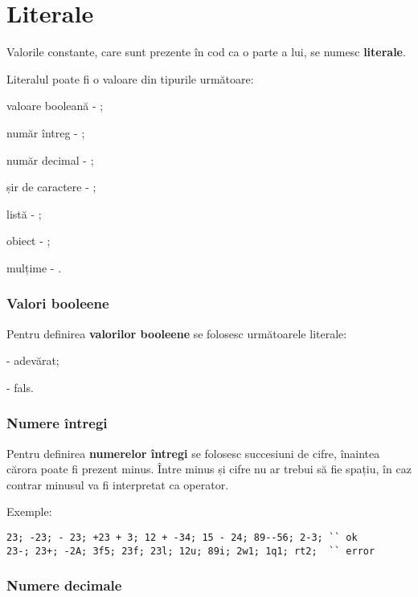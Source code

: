 \section{Literale}

Valorile constante, care sunt prezente în cod ca o parte a lui, se numesc {\bf literale}.

Literalul poate fi o valoare din tipurile următoare:

\begin{icItems}
	\item
		valoare booleană - \bool{};
	\item
		număr întreg - \integer{};
	\item
		număr decimal - \double{};
	\item
		șir de caractere - \str{};
	\item
		listă - \listtype{};
	\item
		obiect - \object{};
	\item
		mulțime - \set{}.
\end{icItems}

\subsubsection{Valori booleene}

Pentru definirea {\bf valorilor booleene} se folosesc următoarele literale:
\begin{icItems}
	\item \true{} - adevărat;
	\item \false{} - fals.
\end{icItems}

\subsubsection{Numere întregi}

Pentru definirea {\bf numerelor întregi} se folosesc succesiuni de cifre, înaintea cărora poate fi prezent minus. Între minus și cifre nu ar trebui să fie spațiu, în caz contrar minusul va fi interpretat ca operator.

\noindent Exemple:
\begin{verbatim}
23; -23; - 23; +23 + 3; 12 + -34; 15 - 24; 89--56; 2-3; `` ok
23-; 23+; -2A; 3f5; 23f; 23l; 12u; 89i; 2w1; 1q1; rt2;  `` error
\end{verbatim}

\subsubsection{Numere decimale}

